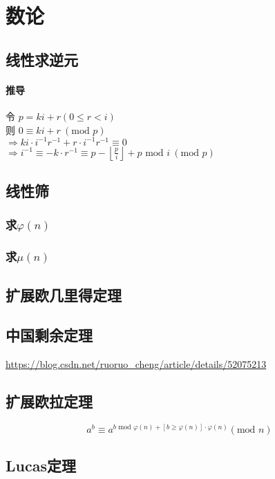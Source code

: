 \documentclass{article}
\begin{document}
	\section{数论}
		\subsection{线性求逆元}
			\paragraph{推导}
			令 $p = ki + r (0 \le r < i)$ \\
			则 $0 \equiv ki + r \: (\text{mod } p)$ \\
			$\Rightarrow ki \cdot i^{-1} r^{-1} + r \cdot i^{-1} r^{-1} \equiv 0$ \\
			$\Rightarrow i^{-1} \equiv -k \cdot r^{-1} \equiv p - \left\lfloor \frac{p}{i}\right\rfloor + p \text{ mod } i \: ( \text{mod } p )$
			
			
		\subsection{线性筛}
			\subsubsection{求$\varphi(n)$}
			
			\subsubsection{求$\mu(n)$}
			
		
		\subsection{扩展欧几里得定理}
		
		\subsection{中国剩余定理}
		\url{https://blog.csdn.net/ruoruo_cheng/article/details/52075213}
		
		\subsection{扩展欧拉定理}
		$$
		a^b \equiv a^{b \text{ mod } \varphi(n) + [b \ge \varphi(n)] \cdot \varphi(n)} (\text{mod } n)
		$$
		
		\subsection{Lucas定理}
		
\end{document}
